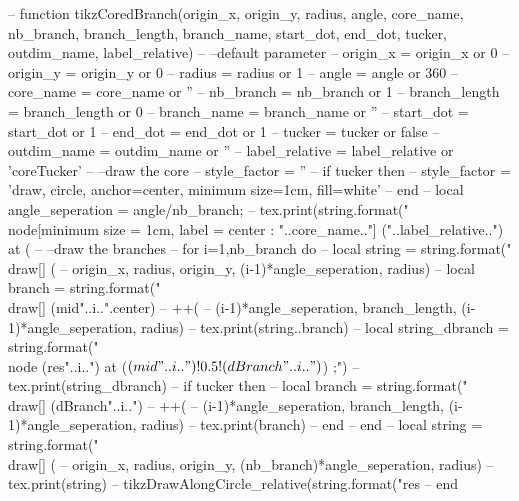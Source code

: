 \begin{luacode*}
	-- function tikzCoredBranch(origin_x, origin_y, radius, angle, core_name, nb_branch, branch_length, branch_name, start_dot, end_dot, tucker, outdim_name, label_relative)
	-- 	--default parameter
	-- 	origin_x = origin_x or 0
	-- 	origin_y = origin_y or 0
	-- 	radius = radius or 1
	-- 	angle = angle or 360
	-- 	core_name = core_name or ''
	-- 	nb_branch = nb_branch or 1
	-- 	branch_length = branch_length or 0
	-- 	branch_name = branch_name or ''
	-- 	start_dot = start_dot or 1
	-- 	end_dot = end_dot or 1
	-- 	tucker = tucker or false
	-- 	outdim_name = outdim_name or ''
	-- 	label_relative = label_relative or 'coreTucker'
	-- 	--draw the core
	-- 	style_factor = ''
	-- 	if tucker then
	-- 	  style_factor = 'draw, circle, anchor=center, minimum size=1cm, fill=white'
	-- 	end
	-- 	local angle_seperation = angle/nb_branch;
	-- 	tex.print(string.format("\\node[minimum size = 1cm, label = center : "..core_name.."] ("..label_relative..") at (%
	-- 	--draw the branches
	-- 	for i=1,nb_branch do
	-- 		local string = string.format("\\draw[] (%
	-- 		origin_x, radius, origin_y, (i-1)*angle_seperation, radius)
	-- 		local branch = string.format("\\draw[] (mid"..i..".center) -- ++(%
	-- 		(i-1)*angle_seperation, branch_length, (i-1)*angle_seperation, radius)
	-- 		tex.print(string..branch)
	-- 		local string_dbranch = string.format("\\node (res"..i..") at ($(mid"..i..")!0.5!(dBranch"..i..")$) {};")
	-- 		tex.print(string_dbranch)
	-- 		if tucker then
	-- 		  local branch = string.format("\\draw[] (dBranch"..i..") -- ++(%
	-- 		  (i-1)*angle_seperation, branch_length, (i-1)*angle_seperation, radius)
	-- 		  tex.print(branch)
	-- 		end
	-- 	end
	-- 	local string = string.format("\\draw[] (%
	-- 	origin_x, radius, origin_y, (nb_branch)*angle_seperation, radius)
	-- 	tex.print(string)
	-- 	tikzDrawAlongCircle_relative(string.format("res%
	-- end


\end{luacode*}

